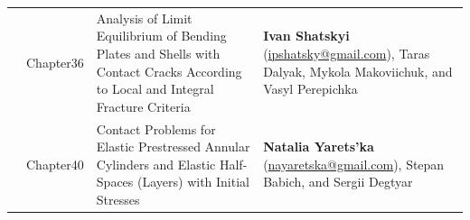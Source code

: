 \documentclass[12pt,a4paper]{article}
\begin{document}
\begin{longtable}{>{\RaggedRight\arraybackslash}p{1.1cm} >{\RaggedRight\arraybackslash}p{1.8cm} >{\RaggedRight\arraybackslash}p{6.4cm} >{\RaggedRight\arraybackslash}p{5.9cm}}
		14 & Chapter36 & Analysis of Limit Equilibrium of Bending Plates and Shells with Contact Cracks According to Local and Integral Fracture Criteria & \textbf{Ivan Shatskyi} (\href{mailto:ipshatsky@gmail.com}{ipshatsky@gmail.com}), Taras Dalyak, Mykola Makoviichuk, and Vasyl Perepichka \\
		
		15 & Chapter40 & Contact Problems for Elastic Prestressed Annular Cylinders and Elastic Half-Spaces (Layers) with Initial Stresses & \textbf{Natalia Yarets’ka} (\href{mailto:nayaretska@gmail.com}{nayaretska@gmail.com}), Stepan Babich, and Sergii Degtyar \\
		
	\end{longtable}
	
\end{document}
